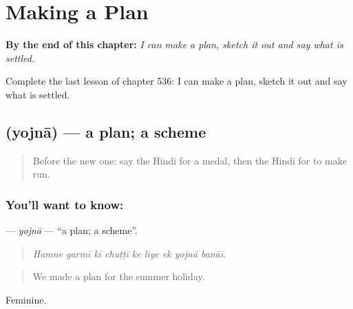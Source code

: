 
\chapter{Making a Plan}
\label{ch:hi-making-a-plan}

\begin{chapteropening}
\textbf{By the end of this chapter:} \emph{I can make a plan, sketch it out and say what is settled.}

Complete the last lesson of chapter 536: I can make a plan, sketch it out and say what is settled.
\end{chapteropening}

\section[\texorpdfstring{\hi{योजना} (yojnā)}{योजना (yojnā)}]{ (yojnā) — a plan; a scheme}

\label{lesson:HI-C536-yojna}



\begin{quote}
Before the new one: say the Hindi for a medal, then the Hindi for to make run.
\end{quote}

\subsection*{You'll want to know: }
\textbf{} — \emph{yojnā} — \textquotedblleft{}a plan; a scheme\textquotedblright{}.

\begin{quote}
        
\end{quote}

\begin{quote}
\emph{Hamne garmī kī chuṭṭī ke liye ek yojnā banāī.}
\end{quote}

\begin{quote}
We made a plan for the summer holiday.
\end{quote}

Feminine.


